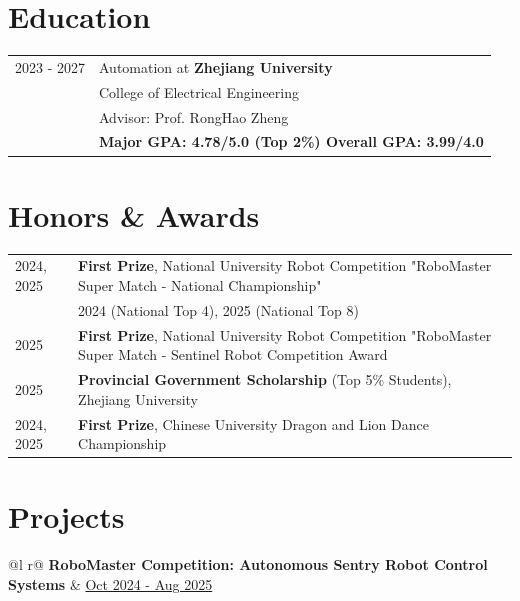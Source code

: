 \documentclass[a4paper,12pt]{article}
\begin{document}
\section{Education}
\begin{tabularx}{\linewidth}{@{}l X@{}}	
2023 - 2027 & Automation at \textbf{Zhejiang University} \hfill \normalsize \\
& College of Electrical Engineering \\
& Advisor: Prof. RongHao Zheng \\
&\textbf{Major GPA: 4.78/5.0 (Top 2\%) Overall GPA: 3.99/4.0} \\
\end{tabularx}

\section{Honors \& Awards}
\begin{tabularx}{\linewidth}{@{}l X@{}}
2024, 2025 & \textbf{First Prize}, National University Robot Competition "RoboMaster Super Match - National Championship" \\
& 2024 (National Top 4), 2025 (National Top 8) \\[3.75pt]
2025 & \textbf{First Prize}, National University Robot Competition "RoboMaster Super Match - Sentinel Robot Competition Award \\[3.75pt]
2025 & \textbf{Provincial Government Scholarship} (Top 5\% Students), Zhejiang University \\
2024, 2025 & \textbf{First Prize}, Chinese University Dragon and Lion Dance Championship \\[3.75pt]
\end{tabularx}

\section{Projects}

\begin{tabularx}{\linewidth}{ @{}l r@{} }
\textbf{RoboMaster Competition: Autonomous Sentry Robot Control Systems} & \hfill \href{https://vamperd.github.io/project/}{Oct 2024 - Aug 2025} \\[3.75pt]
  \\
\end{tabularx}
\end{document}
